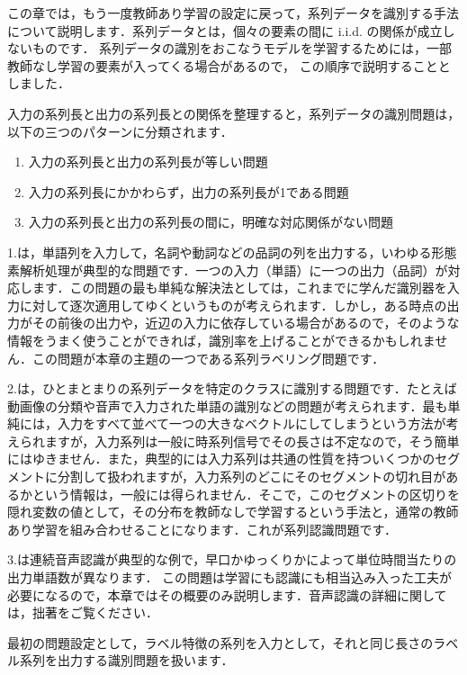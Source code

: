 ﻿%

この章では，もう一度教師あり学習の設定に戻って，系列データを識別する手法について説明します．系列データとは，個々の要素の間に i.i.d. の関係が成立しないものです．
系列データの識別をおこなうモデルを学習するためには，一部教師なし学習の要素が入ってくる場合があるので，
この順序で説明することとしました．

入力の系列長と出力の系列長との関係を整理すると，系列データの識別問題は，以下の三つのパターンに分類されます．

\begin{enumerate}
\item 入力の系列長と出力の系列長が等しい問題
\item 入力の系列長にかかわらず，出力の系列長が1である問題
\item 入力の系列長と出力の系列長の間に，明確な対応関係がない問題
\end{enumerate}

1.は，単語列を入力して，名詞や動詞などの品詞の列を出力する，いわゆる形態素解析処理が典型的な問題です．一つの入力（単語）に一つの出力（品詞）が対応します．この問題の最も単純な解決法としては，これまでに学んだ識別器を入力に対して逐次適用してゆくというものが考えられます．しかし，ある時点の出力がその前後の出力や，近辺の入力に依存している場合があるので，そのような情報をうまく使うことができれば，識別率を上げることができるかもしれません．この問題が本章の主題の一つである系列ラベリング問題です．

2.は，ひとまとまりの系列データを特定のクラスに識別する問題です．たとえば動画像の分類や音声で入力された単語の識別などの問題が考えられます．最も単純には，入力をすべて並べて一つの大きなベクトルにしてしまうという方法が考えられますが，入力系列は一般に時系列信号でその長さは不定なので，そう簡単にはゆきません．また，典型的には入力系列は共通の性質を持ついくつかのセグメントに分割して扱われますが，入力系列のどこにそのセグメントの切れ目があるかという情報は，一般には得られません．そこで，このセグメントの区切りを隠れ変数の値として，その分布を教師なしで学習するという手法と，通常の教師あり学習を組み合わせることになります．これが系列認識問題です．

3.は連続音声認識が典型的な例で，早口かゆっくりかによって単位時間当たりの出力単語数が異なります．
この問題は学習にも認識にも相当込み入った工夫が必要になるので，本章ではその概要のみ説明します．音声認識の詳細に関しては，拙著\cite{araki15}をご覧ください．


最初の問題設定として，ラベル特徴の系列を入力として，それと同じ長さのラベル系列を出力する識別問題を扱います．

